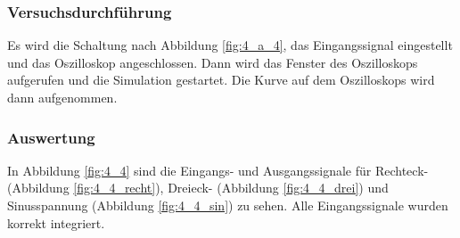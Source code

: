\documentclass[12pt,a4paper]{article}
\begin{document}
\subsubsection{Versuchsdurchführung}

Es wird die Schaltung nach Abbildung \ref{fig:4_a_4}, das Eingangssignal eingestellt und das Oszilloskop angeschlossen. Dann wird das Fenster des Oszilloskops aufgerufen und die Simulation gestartet. Die Kurve auf dem Oszilloskops wird dann aufgenommen.


\subsubsection{Auswertung}

In Abbildung \ref{fig:4_4} sind die Eingangs- und Ausgangssignale für Rechteck- (Abbildung \ref{fig:4_4_recht}), Dreieck- (Abbildung \ref{fig:4_4_drei}) und Sinusspannung (Abbildung \ref{fig:4_4_sin}) zu sehen. Alle Eingangssignale wurden korrekt integriert.
\end{document}
